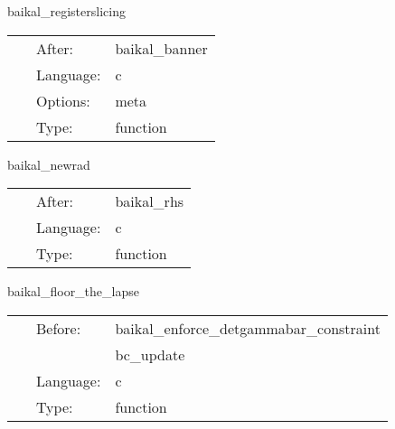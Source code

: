 \vspace{5mm}


\hspace{5mm} baikal\_registerslicing 

\hspace{5mm}{\it register 3+1 slicing condition } 


\hspace{5mm}

 \begin{tabular*}{160mm}{cll} 
~ & After:  & baikal\_banner \\ 
~ & Language:  & c \\ 
~ & Options:  & meta \\ 
~ & Type:  & function \\ 
\end{tabular*} 


\vspace{5mm}


\hspace{5mm} baikal\_newrad 

\hspace{5mm}{\it newrad boundary conditions, scheduled right after rhs eval. } 


\hspace{5mm}

 \begin{tabular*}{160mm}{cll} 
~ & After:  & baikal\_rhs \\ 
~ & Language:  & c \\ 
~ & Type:  & function \\ 
\end{tabular*} 


\vspace{5mm}


\hspace{5mm} baikal\_floor\_the\_lapse 

\hspace{5mm}{\it set lapse = max(lapse\_floor, lapse) } 


\hspace{5mm}

 \begin{tabular*}{160mm}{cll} 
~ & Before:  & baikal\_enforce\_detgammabar\_constraint \\ 
~& ~ &bc\_update\\ 
~ & Language:  & c \\ 
~ & Type:  & function \\ 
\end{tabular*} 


